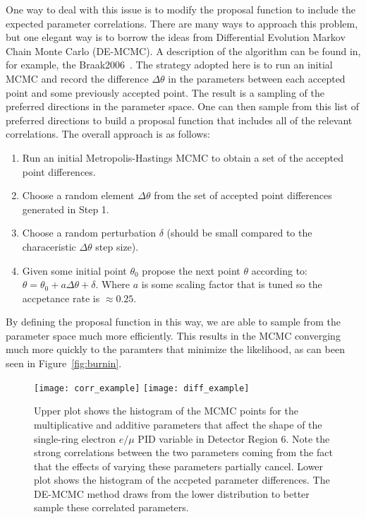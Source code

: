 One way to deal with this issue is to modify the proposal function to include
the expected parameter correlations.  There are many ways to approach this
problem, but one elegant way is to borrow the ideas from Differential Evolution
Markov Chain Monte Carlo (DE-MCMC).  A description of the algorithm can be
found in, for example, the Braak2006~\cite{Braak2006}. The strategy adopted
here is to run an initial MCMC and record the difference $\Delta \theta$ in the
parameters between each accepted point and some previously accepted point. The
result is a sampling of the preferred directions in the parameter space. One
can then sample from this list of preferred directions to build a proposal
function that includes all of the relevant correlations.  The overall approach
is as follows:
%
\begin{enumerate}
  \item Run an initial Metropolis-Hastings MCMC to obtain a set of the
    accepted point differences.  
  \item Choose a random element $\Delta \theta$ from the set of accepted point
    differences generated in Step 1.
  \item Choose a random perturbation $\delta$ (should be small compared to the characeristic
    $\Delta \theta$ step size).
  \item Given some initial point $\theta_{0}$ propose the next point $\theta$
    according to: $\theta = \theta_{0} + a \Delta \theta + \delta$. Where $a$ is some scaling factor that is
    tuned so the accpetance rate is $\approx 0.25$.
\end{enumerate}
%
By defining the proposal function in this way, we are able to sample from the
parameter space much more efficiently. This results in the MCMC converging much
more quickly to the paramters that minimize the likelihood, as can been seen in
Figure~\ref{fig:burnin}.


\begin{figure}[h]
  \begin{center}
    \texttt{[image: corr\_example]}
    \texttt{[image: diff\_example]}
  \end{center}
  \caption{Upper plot shows the histogram of the MCMC points for the
  multiplicative and additive parameters that affect the shape of the
  single-ring electron $e/\mu$ PID variable in Detector Region 6.  Note
  the strong correlations between the two parameters coming from the fact that
  the effects of varying these parameters partially cancel.  Lower plot shows
  the histogram of the accpeted parameter differences.  The DE-MCMC method
  draws from the lower distribution to better sample these correlated parameters.}
  \label{fig:parcor}
\end{figure}


